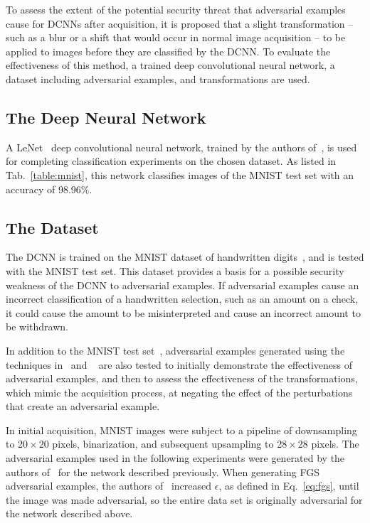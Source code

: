 \documentclass[conference]{IEEEtran}
\begin{document}
To assess the extent of the potential security threat that adversarial examples cause for DCNNs after acquisition, it is proposed that a slight transformation -- such as a blur or a shift that would occur in normal image acquisition -- to be applied to images before they are classified by the DCNN.  To evaluate the effectiveness of this method, a trained deep convolutional neural network, a dataset including adversarial examples, and transformations are used.
\subsection{The Deep Neural Network}
A LeNet~\cite{c13} deep convolutional neural network, trained by the authors of~\cite{c1}, is used for completing classification experiments on the chosen dataset.  As listed in Tab.~\ref{table:mnist}, this network classifies images of the MNIST test set with an accuracy of 98.96\%.  
\subsection{The Dataset}
The DCNN is trained on the MNIST dataset of handwritten digits~\cite{c9}, and is tested with the MNIST test set.  This dataset provides a basis for a possible security weakness of the DCNN to adversarial examples.  If adversarial examples cause an incorrect classification of a handwritten selection, such as an amount on a check, it could cause the amount to be misinterpreted and cause an incorrect amount to be withdrawn.\par  
In addition to the MNIST test set~\cite{c9}, adversarial examples generated using the techniques in~\cite{c1} and ~\cite{c5} are also tested to initially demonstrate the effectiveness of adversarial examples, and then to assess the effectiveness of the transformations, which mimic the acquisition process, at negating the effect of the perturbations that create an adversarial example.  \par
In initial acquisition, MNIST images were subject to a pipeline of downsampling to 20\,$\times$\,20 pixels, binarization, and subsequent upsampling to 28\,$\times$\,28 pixels.
The adversarial examples used in the following experiments were generated by the authors of~\cite{c1} for the network described previously.  When generating FGS adversarial examples, the authors of~\cite{c1} increased \(\epsilon\), as defined in Eq.~\ref{eq:fgs}, until the image was made adversarial, so the entire data set is originally adversarial for the network described above.
\end{document}
